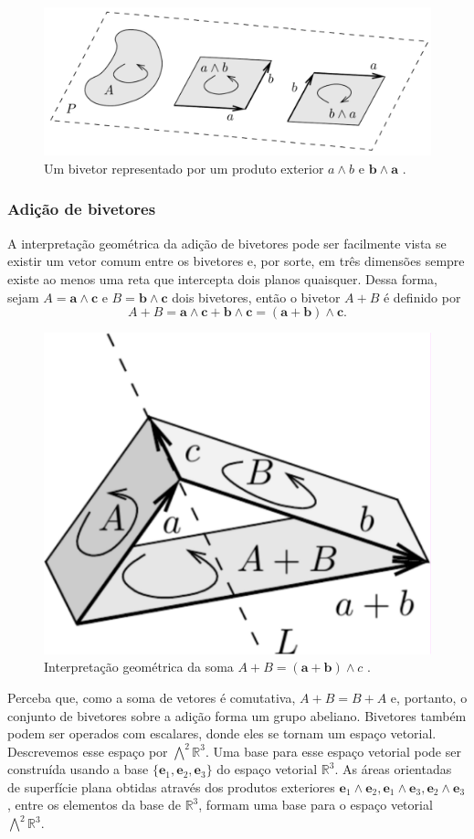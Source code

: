 \documentclass[a4paper,12pt]{report}
\theoremstyle{plain}
\theoremstyle{definition}
\begin{document}
	\begin{figure}[H]
		\begin{center}
			\includegraphics[width=0.75\linewidth]{figures/2bladePlano.pdf}
		\end{center}
		\caption{Um bivetor representado por um produto exterior $a\wedge b$ e $\mathbf b \wedge \mathbf a$ \cite{lundholm2009clifford}.}
		\label{fig:2bladePlano}
	\end{figure}

\subsubsection{Adição de bivetores}

A interpretação geométrica da adição de bivetores pode ser facilmente vista se existir um vetor comum entre os bivetores e, por sorte, em três dimensões sempre existe ao menos uma reta que intercepta dois planos quaisquer. Dessa forma, sejam $A = \mathbf a \wedge \mathbf c$ e $B = \mathbf b \wedge \mathbf c$ dois bivetores, então o bivetor $A + B$ é definido por $$A+B = \mathbf a \wedge \mathbf c + \mathbf b \wedge \mathbf c = (\mathbf a+ \mathbf b) \wedge \mathbf c.$$ 

\begin{figure}[H]
	\begin{center}
		\includegraphics[width=0.32\linewidth]{figures/2bladeSoma.pdf}
	\end{center}
	\caption{Interpretação geométrica da soma $A+B = (\mathbf a+\mathbf b)\wedge c$ \cite{lundholm2009clifford}.}
	\label{fig:2bladeSoma}
\end{figure}

Perceba que, como a soma de vetores é comutativa, $A+B = B+A$ e, portanto, o conjunto de bivetores sobre a adição forma um grupo abeliano. Bivetores também podem ser operados com escalares, donde eles se tornam um espaço vetorial. Descrevemos esse espaço por $\bigwedge^2\mathbb{R}^3$. Uma base para esse espaço vetorial pode ser construída usando a base $\{\mathbf e_1,\mathbf e_2,\mathbf e_3\}$ do espaço vetorial $\mathbb{R}^3$. As áreas orientadas de superfície plana obtidas através dos produtos exteriores $\mathbf e_1 \wedge \mathbf e_2, \mathbf e_1 \wedge \mathbf e_3, \mathbf e_2 \wedge \mathbf e_3$, entre os elementos da base de $\mathbb{R}^3$, formam uma base para o espaço vetorial $\bigwedge^2\mathbb{R}^3$.
\end{document}
